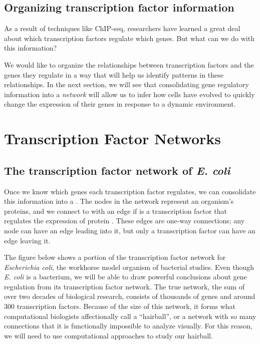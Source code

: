 \begin{qbox}\end{qbox} 


\FloatBarrier
{}
\subsection{Organizing transcription factor information}

As a result of techniques like ChIP-seq, researchers have learned a great deal about which transcription factors regulate which genes. But what can we do with this information?

We would like to organize the relationships between transcription factors and the genes they regulate in a way that will help us identify patterns in these relationships. In the next section, we will see that consolidating gene regulatory information into a \textit{network} will allow us to infer how cells have evolved to quickly change the expression of their genes in response to a dynamic environment.


\FloatBarrier
{}

\section{Transcription Factor Networks}
\label{sec:transcription_factor_networks}

\subsection{The transcription factor network of \textit{E. coli}}

Once we know which genes each transcription factor regulates, we can consolidate this information into a . The nodes in the network represent an organism's proteins, and we connect  to  with an edge if  is a transcription factor that regulates the expression of protein . These edges are one-way connections; any node can have an edge leading into it, but only a transcription factor can have an edge leaving it.

The figure below shows a portion of the transcription factor network for \textit{Escherichia coli}, the workhorse model organism of bacterial studies. Even though \textit{E. coli} is a bacterium, we will be able to draw powerful conclusions about gene regulation from its transcription factor network. The true network, the sum of over two decades of biological research, consists of thousands of genes and around 300 transcription factors. Because of the size of this network, it forms what computational biologists affectionally call a ``hairball'', or a network with so many connections that it is functionally impossible to analyze visually. For this reason, we will need to use computational approaches to study our hairball.


